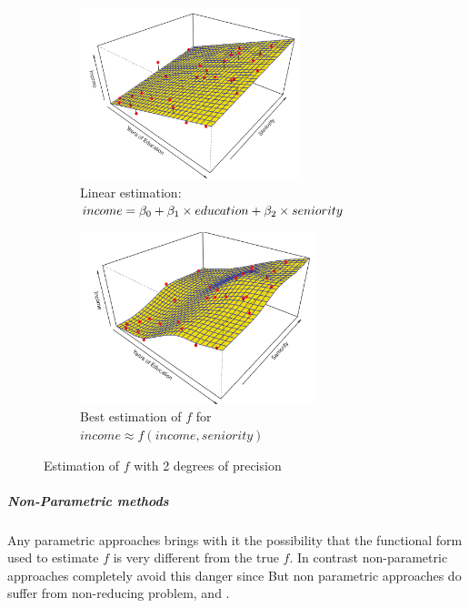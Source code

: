 \begin{figure}[H]
\begin{subfigure}{0.5\textwidth}
  \includegraphics[width=0.9\linewidth, height=5cm]{./chap/1chap/1sec/1images/1_3linearEstimation.png} 
  \caption{Linear estimation:\\$income=\\\beta_{0}+\beta_{1}\times education+\beta_{2}\times seniority$}
  \label{fig:1.3_1}
\end{subfigure}
\begin{subfigure}{0.5\textwidth}
  \includegraphics[width=0.9\linewidth, height=5cm]{./chap/1chap/1sec/1images/1_4BestEstimation.png} 
  \caption{Best estimation of $f$ for\\ $income\approx f\left( income,seniority \right)$}
  \label{fig:1.3_2}
\end{subfigure}
\caption{Estimation of $f$ with 2 degrees of precision}
\label{fig:1.4}
\end{figure}

\subparagraph{Non-Parametric methods}
Any parametric approaches brings with it the possibility that the
functional form used to estimate $f$ is very different from the true
$f$. In contrast non-parametric approaches completely avoid this danger
since  But non
parametric approaches do suffer from non-reducing problem, and .
